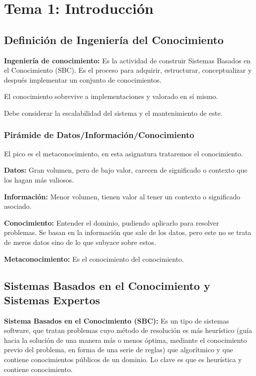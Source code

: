 \documentclass[12pt, twoside, openright]{report} %
\begin{document}
\chapter{Tema 1: Introducción}
\section{Definición de Ingeniería del Conocimiento}

\textbf{Ingeniería de conocimiento:} Es la actividad de construir Sistemas Basados en el Conocimiento (SBC). Es el proceso para adquirir, estructurar, conceptualizar y después implementar un conjunto de conocimientos.

El conocimiento sobrevive a implementaciones y valorado en sí mismo.

Debe considerar la escalabilidad del sistema y el mantenimiento de este.

\subsection{Pirámide de Datos/Información/Conocimiento}
El pico es el metaconocimiento, en esta asignatura trataremos el conocimiento.

\textbf{Datos:} Gran volumen, pero de bajo valor, carecen de significado o contexto que los hagan más valiosos.

\textbf{Información:} Menor volumen, tienen valor al tener un contexto o significado asociado.

\textbf{Conocimiento:} Entender el dominio, pudiendo aplicarlo para resolver problemas. Se basan en la información que sale de los datos, pero este no se trata de meros datos sino de lo que subyace sobre estos. 

\textbf{Metaconocimiento:} Es el conocimiento del conocimiento.

\section{Sistemas Basados en el Conocimiento y Sistemas Expertos}

\textbf{Sistema Basados en el Conocimiento (SBC):} Es un tipo de sistemas software, que tratan problemas cuyo método de resolución es más heurístico (guía hacia la solución de una manera más o menos óptima, mediante el conocimiento previo del problema, en forma de una serie de reglas) que algorítmico y que contiene conocimientos públicos de un dominio. Lo clave es que es heurística y contiene conocimiento. 
\end{document}
